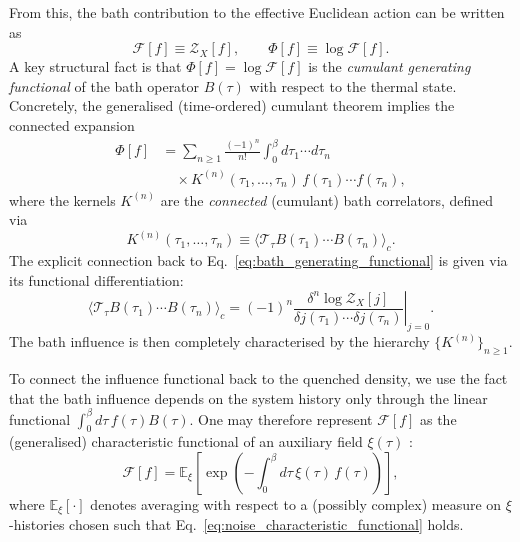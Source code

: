 From this, the bath contribution to the effective Euclidean action can be written as \cite{feynmanTheoryGeneralQuantum1963a,grabertQuantumBrownianMotion1988,caldeiraQuantumTunnellingDissipative1983a}
\begin{equation}
    \mathcal F[f] \equiv \mathcal Z_X[f],
    \qquad
    \Phi[f] \equiv \log \mathcal F[f].
    \label{eq:influence_functional_definition}
\end{equation}
A key structural fact is that $\Phi[f]=\log\mathcal F[f]$ is the \emph{cumulant generating functional} of the bath operator $B(\tau)$ with respect to the thermal state. Concretely, the generalised
(time-ordered) cumulant theorem implies the connected expansion
\cite{Kubo1962,BreuerMaPetruccione2002}
\begin{equation}
\begin{split}
\Phi[f]
&=
\sum_{n\ge 1}\frac{(-1)^n}{n!}\!\!\int_0^\beta\!\! d\tau_1\cdots d\tau_n\, \\
&\quad\times K^{(n)}(\tau_1,\ldots,\tau_n)\,
f(\tau_1)\cdots f(\tau_n),
\end{split}
\label{eq:influence_cumulant_expansion}
\end{equation}
where the kernels $K^{(n)}$ are the \emph{connected} (cumulant) bath correlators, defined via \cite{DasThermalFieldTheory}
\begin{equation}
    K^{(n)}(\tau_1,\ldots,\tau_n)
    \equiv
    \big\langle \mathcal T_\tau B(\tau_1)\cdots B(\tau_n)\big\rangle_c.
    \label{eq:Kn_as_connected_bath_correlators}
\end{equation}
The explicit connection back to Eq.~\eqref{eq:bath_generating_functional} is given via its functional differentiation:
\begin{equation}
    \big\langle \mathcal T_\tau B(\tau_1)\cdots B(\tau_n)\big\rangle_c = (-1)^n \left. \frac{\delta^n \log \mathcal Z_X[j]}{\delta j(\tau_1)\cdots\delta j(\tau_n)} \right|_{j=0}.
    \label{eq:connected_correlator_oneliner}
\end{equation}
The bath influence is then completely characterised by the hierarchy $\{K^{(n)}\}_{n\ge1}$. 

To connect the influence functional back to the quenched density, we use the fact that the bath
influence depends on the system history only through the linear functional $\int_0^\beta d\tau\, f(\tau)B(\tau)$. One may therefore represent $\mathcal F[f]$ as the (generalised) characteristic functional of an
auxiliary field $\xi(\tau)$ \cite{hubbardCalculationPartitionFunctions1959a,stratonovich1957QDistro,stockburgerExactNumberRepresentation2002}:
\begin{equation}
\mathcal F[f]
=
\mathbb E_\xi\!\left[\exp\!\left(-\int_0^\beta d\tau\,\xi(\tau)\,f(\tau)\right)\right],
\label{eq:noise_characteristic_functional}
\end{equation}
where $\mathbb E_\xi[\cdot]$ denotes averaging with respect to a (possibly complex) measure on
$\xi$-histories chosen such that Eq.~\eqref{eq:noise_characteristic_functional} holds.

